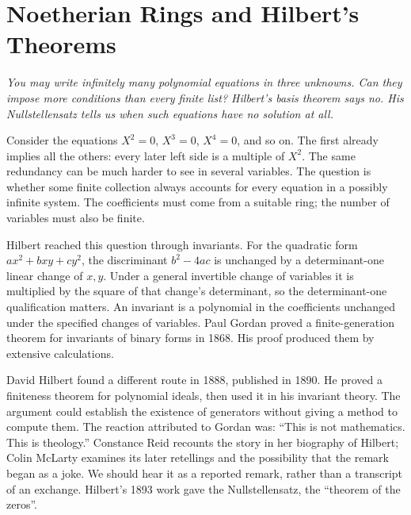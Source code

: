 \chapter{Noetherian Rings and Hilbert's Theorems}

\begin{center}\itshape
You may write infinitely many polynomial equations in three unknowns. Can they impose more conditions than every finite list? Hilbert's basis theorem says no. His Nullstellensatz tells us when such equations have no solution at all.
\end{center}

Consider the equations $X^2=0$, $X^3=0$, $X^4=0$, and so on. The first already implies all the others: every later left side is a multiple of $X^2$. The same redundancy can be much harder to see in several variables. The question is whether some finite collection always accounts for every equation in a possibly infinite system. The coefficients must come from a suitable ring; the number of variables must also be finite.

Hilbert reached this question through invariants. For the quadratic form $ax^2+bxy+cy^2$, the discriminant $b^2-4ac$ is unchanged by a determinant-one linear change of $x,y$. Under a general invertible change of variables it is multiplied by the square of that change's determinant, so the determinant-one qualification matters. An invariant is a polynomial in the coefficients unchanged under the specified changes of variables. Paul Gordan proved a finite-generation theorem for invariants of binary forms in 1868. His proof produced them by extensive calculations.

David Hilbert found a different route in 1888, published in 1890. He proved a finiteness theorem for polynomial ideals, then used it in his invariant theory. The argument could establish the existence of generators without giving a method to compute them. The reaction attributed to Gordan was: ``This is not mathematics. This is theology.'' Constance Reid recounts the story in her biography of Hilbert; Colin McLarty examines its later retellings and the possibility that the remark began as a joke. We should hear it as a reported remark, rather than a transcript of an exchange. Hilbert's 1893 work gave the Nullstellensatz, the ``theorem of the zeros''.


